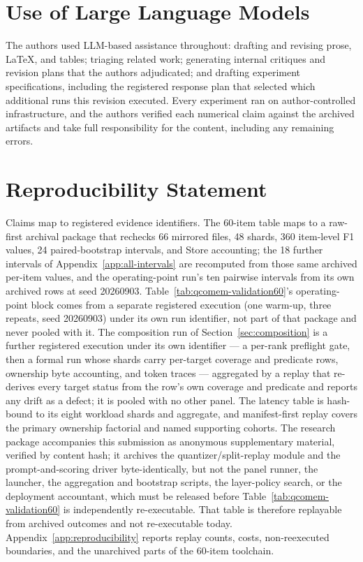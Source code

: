 \documentclass{article}
\begin{document}
\section*{Use of Large Language Models}
The authors used LLM-based assistance throughout: drafting and revising prose,
LaTeX, and tables; triaging related work; generating internal critiques and
revision plans that the authors adjudicated; and drafting experiment
specifications, including the registered response plan that selected which
additional runs this revision executed. Every experiment ran on
author-controlled infrastructure, and the authors verified each numerical claim
against the archived artifacts and take full responsibility for the content,
including any remaining errors.

\section*{Reproducibility Statement}
Claims map to registered evidence identifiers. The 60-item table maps to a
raw-first archival package that rechecks 66 mirrored files, 48 shards, 360
item-level F1 values, 24 paired-bootstrap intervals, and Store accounting; the
18 further intervals of Appendix~\ref{app:all-intervals} are recomputed from
those same archived per-item values, and the operating-point run's ten pairwise
intervals from its own archived rows at seed 20260903.
Table~\ref{tab:qcomem-validation60}'s operating-point block comes from a
separate registered execution (one warm-up, three repeats, seed 20260903) under
its own run identifier, not part of that package and never pooled with it.  The
composition run of Section~\ref{sec:composition} is a further registered
execution under its own identifier --- a per-rank preflight gate, then a formal
run whose shards carry per-target coverage and predicate rows, ownership byte
accounting, and token traces --- aggregated by a replay that re-derives every
target status from the row's own coverage and predicate and reports any drift
as a defect; it is pooled with no other panel. The
latency table is hash-bound to its eight workload shards and aggregate, and
manifest-first replay covers the primary ownership factorial and named
supporting cohorts. The research package accompanies this submission as
anonymous supplementary material, verified by content hash; it archives the
quantizer/split-replay module and the prompt-and-scoring driver
byte-identically, but not the panel runner, the launcher, the aggregation and
bootstrap scripts, the layer-policy search, or the deployment accountant, which
must be released before Table~\ref{tab:qcomem-validation60} is independently
re-executable. That table is therefore replayable from archived outcomes and not
re-executable today. Appendix~\ref{app:reproducibility} reports replay counts,
costs, non-reexecuted boundaries, and the unarchived parts of the 60-item
toolchain.
\end{document}
